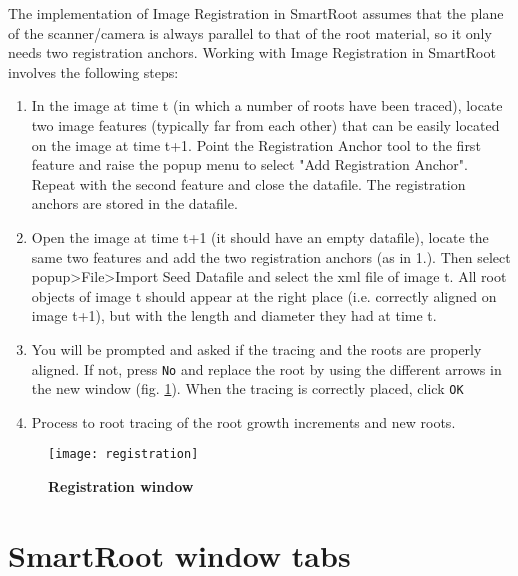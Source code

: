 \documentclass[a4paper,english,10pt]{report}
\begin{document}
The implementation of Image Registration in SmartRoot assumes that the plane of the scanner/camera is always parallel to that of the root material, so it only needs two registration anchors. Working with Image Registration in SmartRoot involves the following steps:\\

\begin{enumerate}
\item In the image at time t (in which a number of roots have been traced), locate two image features (typically far from each other) that can be easily located on the image at time t+1. Point the Registration Anchor tool to the first feature and raise the popup menu to select "Add Registration Anchor". Repeat with the second feature and close the datafile. The registration anchors are stored in the datafile.
\item Open the image at time t+1 (it should have an empty datafile), locate the same two features and add the two registration anchors (as in 1.). Then select popup>File>Import Seed Datafile and select the xml file of image t. All root objects of image t should appear at the right place (i.e. correctly aligned on image t+1), but with the length and diameter they had at time t.
\item You will be prompted and asked if the tracing  and the roots are properly aligned. If not, press \verb|No| and replace the root by using the different arrows in the new window (fig. \ref{registration}). When the tracing is correctly placed, click \verb|OK|
\item Process to root tracing of the root growth increments and new roots.\\
\end{enumerate}


\begin{figure}[htbp]
\begin{center}
\texttt{[image: registration]}
\caption[Registration window]{\textbf{Registration window}}
\label{registration}
\end{center}
\end{figure}




\chapter{SmartRoot window tabs} 
\label{tabs}
\end{document}
